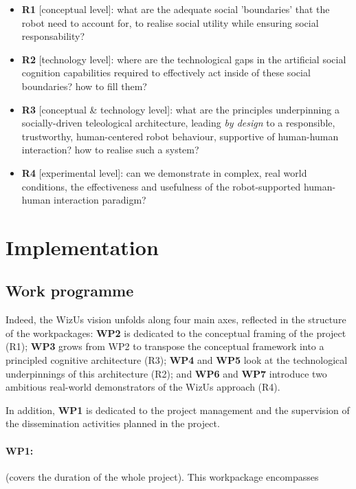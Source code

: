 \documentclass[11pt]{report}
\newcommand{\project}{WizUs\xspace}
\begin{document}
\begin{itemize}
    \item \textbf{R1} [conceptual level]: what are the adequate social 'boundaries' that the robot need to
        account for, to realise social utility while ensuring social
        responsability?
    \item \textbf{R2} [technology level]: where are the technological gaps in the artificial social cognition
        capabilities required to effectively act inside of these social
        boundaries? how to fill them?
    \item \textbf{R3} [conceptual \& technology level]: what are the principles underpinning a
        socially-driven teleological architecture, leading \emph{by design} to a
        responsible, trustworthy, human-centered robot behaviour, supportive of human-human
        interaction? how to realise such a system?
    \item \textbf{R4} [experimental level]: can we demonstrate in complex, real
        world conditions, the effectiveness and usefulness of the robot-supported human-human
        interaction paradigm?
\end{itemize}


\section{Implementation}

\subsection{Work programme}

Indeed, the \project vision unfolds along four main axes, reflected in the
structure of the workpackages: \textbf{WP2} is dedicated to the conceptual
framing of the project (R1); \textbf{WP3} grows from WP2 to transpose the
conceptual framework into a principled cognitive architecture (R3); \textbf{WP4}
and \textbf{WP5} look at the technological underpinnings of this architecture
(R2); and \textbf{WP6} and \textbf{WP7} introduce two ambitious real-world
demonstrators of the \project approach (R4).

In addition, \textbf{WP1} is dedicated to the project management and the
supervision of the dissemination activities planned in the project.

\paragraph{WP1: \textbf{\wpOne}} (covers the duration of the whole project).
This workpackage encompasses
\end{document}
